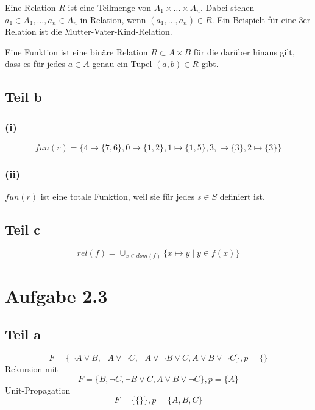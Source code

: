 \documentclass[10pt,a4paper]{article}
\begin{document}
Eine Relation $R$ ist eine Teilmenge von $A_{1} \times \dots \times A_{n}$.
Dabei stehen $a_{1} \in A_{1}, \dots, a_{n} \in A_{n}$ in Relation, wenn $(a_{1}, \dots, a_{n}) \in R$.
Ein Beispielt für eine 3er Relation ist die Mutter-Vater-Kind-Relation.

Eine Funktion ist eine binäre Relation $R \subset A \times B$ für die darüber hinaus gilt, dass es für jedes $a \in A$ genau ein Tupel $(a, b) \in R$ gibt.

\subsection{Teil b}

\subsubsection{(i)}

\begin{equation}
  fun(r) = \{ 4 \mapsto \{ 7, 6 \}, 0 \mapsto \{ 1, 2 \}, 1 \mapsto \{ 1, 5 \}, 3, \mapsto \{ 3 \}, 2 \mapsto \{ 3 \} \}
\end{equation}

\subsubsection{(ii)}

$fun(r)$ ist eine totale Funktion, weil sie für jedes $s \in S$ definiert ist.

\subsection{Teil c}

\begin{equation}
  rel(f) = \cup_{x \in dom(f)} \{ x \mapsto y \mid y \in f(x) \}
\end{equation}

\section{Aufgabe 2.3}

\subsection{Teil a}

\begin{equation}
  F = \{ \neg A \lor B, \neg A \lor \neg C, \neg A \lor \neg B \lor C, A \lor B \lor \neg C \}, p = \{  \}
\end{equation}
Rekursion mit
\begin{equation}
  F = \{ B, \neg C, \neg B \lor C, A \lor B \lor \neg C \}, p = \{ A \}
\end{equation}
Unit-Propagation
\begin{equation}
  F = \{ \{  \} \}, p = \{ A, B, C \}
\end{equation}
\end{document}

